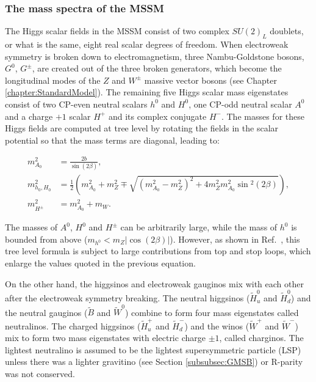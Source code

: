 \subsubsection{The mass spectra of the MSSM}

The Higgs scalar fields in the MSSM consist of two complex $SU(2)_L$ doublets, or what is the same, eight real scalar degrees of freedom.
When electroweak symmetry is broken down to electromagnetism, three Nambu-Goldstone bosons, $G^0$, $G^\pm$, are created out of the three broken generators, which become the longitudinal modes of the $Z$ and $W^\pm$ massive vector bosons (see Chapter \ref{chapter:StandardModel}).
The remaining five Higgs scalar mass eigenstates consist of two CP-even neutral scalars $h^0$ and $H^0$, one CP-odd neutral scalar $A^0$ and a charge $+1$ scalar $H^+$ and its complex conjugate $H^-$.
The masses for these Higgs fields are computed at tree level by rotating the fields in the scalar potential so that the mass terms are diagonal, leading to:

\begin{equation}
\begin{split}
m^2_{A_0} & = \frac{2b}{\sin{(2\beta)}}, \\
m^2_{h_0, H_0} & = \frac{1}{2}\left( m^2_{A_0} + m^2_Z \mp \sqrt{(m^2_{A_0} - m^2_Z)^2 + 4 m^2_Z m^2_{A_0} \sin{}^2(2\beta)} \right), \\
m^2_{H^\pm} & = m^2_{A_0} + m_W.
\end{split}
\label{eq:SUSYMSSMHiggsMasses}
\end{equation}

The masses of $A^0$, $H^0$ and $H^\pm$ can be arbitrarily large, while the mass of $h^0$ is bounded from above ($m_{h^0} < m_Z |\cos{(2\beta)}|$).
However, as shown in Ref.~\cite{Flores:1982pr}, this tree level formula is subject to large contributions from top and stop loops, which enlarge the values quoted in the previous equation.

On the other hand, the higgsinos and electroweak gauginos mix with each other after the electroweak symmetry breaking.
The neutral higgsinos ($\tilde{H}_u^0$ and $\tilde{H}_d^0$) and the neutral gauginos ($\tilde{B}$ and $\tilde{W}^0$) combine to form four mass eigenstates called neutralinos.
The charged higgsinos ($\tilde{H}^+_u$ and $\tilde{H}^-_d$) and the winos ($\tilde{W}^+$ and $\tilde{W}^-$) mix to form two mass eigenstates with electric charge $\pm 1$, called charginos.
The lightest neutralino is assumed to be the lightest supersymmetric particle (LSP) unless there was a lighter gravitino (see Section \ref{subsubsec:GMSB}) or R-parity was not conserved.

